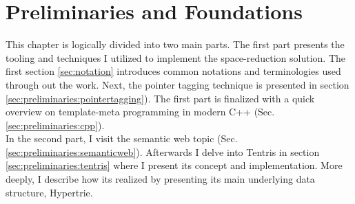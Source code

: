 \chapter{Preliminaries and Foundations}
\label{ch:preliminaries}

This chapter is logically divided into two main parts. The first part presents the tooling and techniques I utilized to implement the space-reduction solution. The first section \ref{sec:notation} introduces common notations and terminologies used through out the work. Next, the pointer tagging technique is presented in section \ref{sec:preliminaries:pointertagging}). The first part is finalized with a quick overview on template-meta programming in modern C++ (Sec. \ref{sec:preliminaries:cpp}). \\ 

In the second part, I visit the semantic web topic (Sec. \ref{sec:preliminaries:semanticweb}). Afterwards I delve into Tentris in section \ref{sec:preliminaries:tentris} where I present its concept and implementation. More deeply, I describe how its realized by presenting its main underlying data structure, Hypertrie. 





